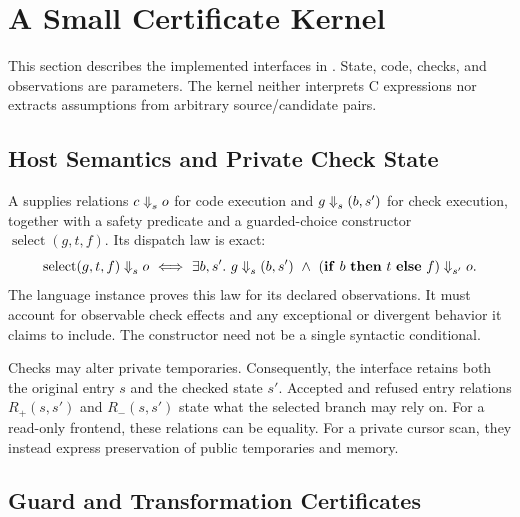 \section{A Small Certificate Kernel}
\label{sec:framework}

This section describes the implemented interfaces in
. State, code, checks, and
observations are parameters. The kernel neither interprets C expressions nor
extracts assumptions from arbitrary source/candidate pairs.

\subsection{Host Semantics and Private Check State}

A  supplies relations $c\mathrel{\Downarrow}_{s}o$ for code execution and
$g\mathrel{\Downarrow}_{s}(b,s')$ for check execution, together with a safety predicate
and a guarded-choice constructor $\operatorname{select}(g,t,f)$. Its dispatch law
is exact:
\begin{equation}
\operatorname{select}(g,t,f)\mathrel{\Downarrow}_{s}o
\ \Longleftrightarrow\
\exists b,s'.\ g\mathrel{\Downarrow}_{s}(b,s')\ \land\
(\mathbf{if}\ b\ \mathbf{then}\ t\ \mathbf{else}\ f)\mathrel{\Downarrow}_{s'}o.
\label{eq:dispatch}
\end{equation}
The language instance proves this law for its declared observations. It must
account for observable check effects and any exceptional or divergent behavior
it claims to include. The constructor need not be a single syntactic conditional.

Checks may alter private temporaries. Consequently, the interface retains both
the original entry $s$ and the checked state $s'$. Accepted and refused entry
relations $R_+(s,s')$ and $R_-(s,s')$ state what the selected branch may rely on.
For a read-only frontend, these relations can be equality. For a private cursor
scan, they instead express preservation of public temporaries and memory.

\subsection{Guard and Transformation Certificates}

